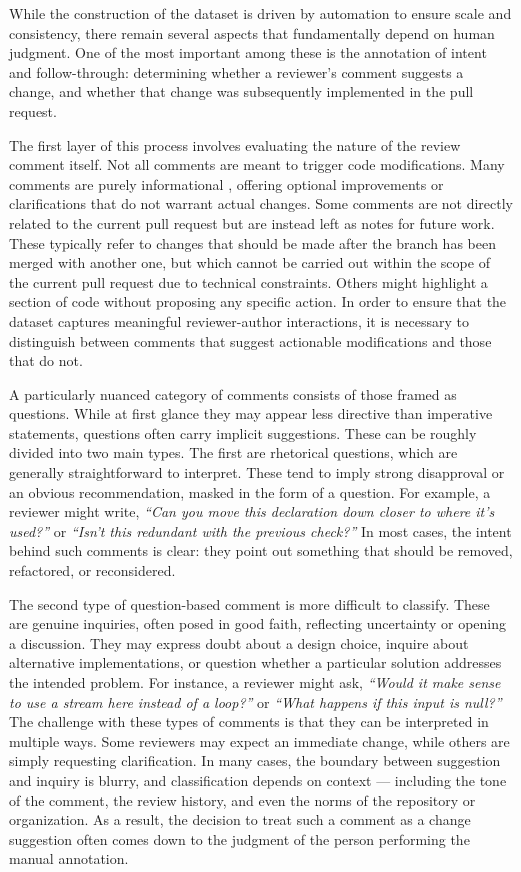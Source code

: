 While the construction of the dataset is driven by automation to ensure scale and consistency, there
remain several aspects that fundamentally depend on human judgment. One of the most important among
these is the annotation of intent and follow-through: determining whether a reviewer’s comment
suggests a change, and whether that change was subsequently implemented in the pull request.

The first layer of this process involves evaluating the nature of the review comment itself. Not all
comments are meant to trigger code modifications. Many comments are purely informational , offering
optional improvements or clarifications that do not warrant actual changes. Some comments are not
directly related to the current pull request but are instead left as notes for future work. These
typically refer to changes that should be made after the branch has been merged with another one,
but which cannot be carried out within the scope of the current pull request due to technical
constraints. Others might highlight a section of code without proposing any specific action. In
order to ensure that the dataset captures meaningful reviewer-author interactions, it is necessary
to distinguish between comments that suggest actionable modifications and those that do not.

A particularly nuanced category of comments consists of those framed as questions. While at first
glance they may appear less directive than imperative statements, questions often carry implicit
suggestions. These can be roughly divided into two main types. The first are rhetorical questions,
which are generally straightforward to interpret. These tend to imply strong disapproval or an
obvious recommendation, masked in the form of a question. For example, a reviewer might write,
\textit{``Can you move this declaration down closer to where it's used?''} or \textit{``Isn't this
redundant with the previous check?''} In most cases, the intent behind such comments is clear: they
point out something that should be removed, refactored, or reconsidered.

The second type of question-based comment is more difficult to classify. These are genuine
inquiries, often posed in good faith, reflecting uncertainty or opening a discussion. They may
express doubt about a design choice, inquire about alternative implementations, or question whether
a particular solution addresses the intended problem. For instance, a reviewer might ask,
\textit{“Would it make sense to use a stream here instead of a loop?”} or \textit{“What happens if
this input is null?”} The challenge with these types of comments is that they can be interpreted in
multiple ways. Some reviewers may expect an immediate change, while others are simply requesting
clarification. In many cases, the boundary between suggestion and inquiry is blurry, and
classification depends on context — including the tone of the comment, the review history, and even
the norms of the repository or organization. As a result, the decision to treat such a comment as a
change suggestion often comes down to the judgment of the person performing the manual annotation.

